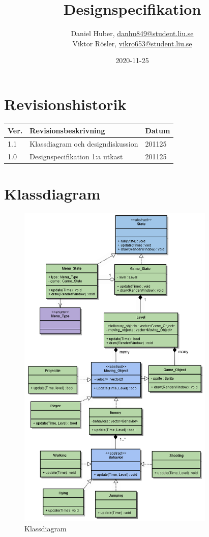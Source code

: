 \documentclass{TDP005mall}
\author{Daniel Huber, \url{danhu849@student.liu.se}\\
  Viktor Rösler, \url{vikro653@student.liu.se}}
\title{Designspecifikation}
\date{2020-11-25}
\begin{document}
\projectpage
\tableofcontents
\newpage
\section{Revisionshistorik}
\begin{table}[!h]
\begin{tabularx}{\linewidth}{|l|X|l|}
\hline
Ver. & Revisionsbeskrivning & Datum \\\hline
1.1 & Klassdiagram och designdiskussion & 201125 \\\hline
1.0 & Designspecifikation 1:a utkast & 201125 \\\hline
\end{tabularx}
\end{table}



\section{Klassdiagram}

\begin{figure}[h!]
  \includegraphics[height=16cm]{UML1.1.png}
  \caption{Klassdiagram\label{fig:1}}
\end{figure}
\end{document}
